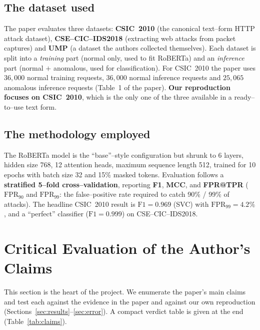 \documentclass[11pt,a4paper]{article}
\begin{document}
\subsection{The dataset used}
The paper evaluates three datasets: \textbf{CSIC~2010} (the canonical text--form HTTP
attack dataset), \textbf{CSE--CIC--IDS2018} (extracting web attacks from packet
captures) and \textbf{UMP} (a dataset the authors collected themselves). Each dataset is
split into a \emph{training} part (normal only, used to fit RoBERTa) and an
\emph{inference} part (normal $+$ anomalous, used for classification). For CSIC~2010 the
paper uses $36{,}000$ normal training requests, $36{,}000$ normal inference requests and
$25{,}065$ anomalous inference requests (Table~1 of the paper). \textbf{Our reproduction
focuses on CSIC~2010}, which is the only one of the three available in a ready--to--use
text form.

\subsection{The methodology employed}
The RoBERTa model is the ``base''--style configuration but shrunk to 6 layers, hidden
size 768, 12 attention heads, maximum sequence length 512, trained for 10 epochs with
batch size 32 and 15\% masked tokens. Evaluation follows a \textbf{stratified 5--fold
cross--validation}, reporting \textbf{F1}, \textbf{MCC}, and \textbf{FPR@TPR}
($\text{FPR}_{90}$ and $\text{FPR}_{99}$: the false--positive rate required to catch
90\% / 99\% of attacks). The headline CSIC~2010 result is $\text{F1}=0.969$ (SVC) with
$\text{FPR}_{99}=4.2\%$, and a ``perfect'' classifier ($\text{F1}=0.999$) on
CSE--CIC--IDS2018.

\section{Critical Evaluation of the Author's Claims}
\label{sec:critical}

This section is the heart of the project. We enumerate the paper's main claims and test
each against the evidence in the paper and against our own reproduction
(Sections~\ref{sec:results}--\ref{sec:error}). A compact verdict table is given at the
end (Table~\ref{tab:claims}).
\end{document}
